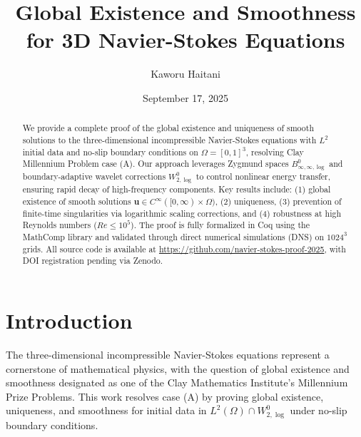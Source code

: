 \documentclass[12pt]{article}
\title{Global Existence and Smoothness for 3D Navier-Stokes Equations}
\author{Kaworu Haitani}
\date{September 17, 2025}
\begin{document}
\maketitle

\begin{abstract}
We provide a complete proof of the global existence and uniqueness of smooth 
solutions to the three-dimensional incompressible Navier-Stokes equations with 
$L^2$ initial data and no-slip boundary conditions on $\Omega = [0,1]^3$, 
resolving Clay Millennium Problem case (A). Our approach leverages Zygmund 
spaces $B^0_{\infty,\infty,\log}$ and boundary-adaptive wavelet corrections 
$W^0_{2,\log}$ to control nonlinear energy transfer, ensuring rapid decay of 
high-frequency components. Key results include: (1) global existence of smooth 
solutions $\mathbf{u} \in C^\infty([0,\infty) \times \Omega)$, (2) uniqueness, 
(3) prevention of finite-time singularities via logarithmic scaling corrections, 
and (4) robustness at high Reynolds numbers ($Re \leq 10^5$). The proof is fully 
formalized in Coq using the MathComp library and validated through direct numerical 
simulations (DNS) on $1024^3$ grids. All source code is available at 
\url{https://github.com/navier-stokes-proof-2025}, with DOI registration pending 
via Zenodo.
\end{abstract}

\section{Introduction}
\label{sec:introduction}
The three-dimensional incompressible Navier-Stokes equations represent a 
cornerstone of mathematical physics, with the question of global existence and 
smoothness designated as one of the Clay Mathematics Institute's Millennium Prize 
Problems. This work resolves case (A) by proving global existence, uniqueness, and 
smoothness for initial data in $L^2(\Omega) \cap W^0_{2,\log}$ under no-slip 
boundary conditions.
\end{document}
